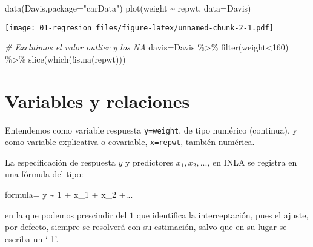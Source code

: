 \documentclass[
]{book}
\newenvironment{Shaded}{\begin{snugshade}}{\end{snugshade}}
\newcommand{\AttributeTok}[1]{\textcolor[rgb]{0.77,0.63,0.00}{#1}}
\newcommand{\CommentTok}[1]{\textcolor[rgb]{0.56,0.35,0.01}{\textit{#1}}}
\newcommand{\DecValTok}[1]{\textcolor[rgb]{0.00,0.00,0.81}{#1}}
\newcommand{\FunctionTok}[1]{\textcolor[rgb]{0.00,0.00,0.00}{#1}}
\newcommand{\NormalTok}[1]{#1}
\newcommand{\OtherTok}[1]{\textcolor[rgb]{0.56,0.35,0.01}{#1}}
\newcommand{\SpecialCharTok}[1]{\textcolor[rgb]{0.00,0.00,0.00}{#1}}
\newcommand{\StringTok}[1]{\textcolor[rgb]{0.31,0.60,0.02}{#1}}
\begin{document}
\begin{Shaded}
\begin{Highlighting}[]
\FunctionTok{data}\NormalTok{(Davis,}\AttributeTok{package=}\StringTok{"carData"}\NormalTok{)}
\FunctionTok{plot}\NormalTok{(weight }\SpecialCharTok{\textasciitilde{}}\NormalTok{ repwt, }\AttributeTok{data=}\NormalTok{Davis)}
\end{Highlighting}
\end{Shaded}

\texttt{[image: 01-regresion\_files/figure-latex/unnamed-chunk-2-1.pdf]}

\begin{Shaded}
\begin{Highlighting}[]
\CommentTok{\# Excluimos el valor outlier y los NA}
\NormalTok{davis}\OtherTok{=}\NormalTok{Davis }\SpecialCharTok{\%\textgreater{}\%}
  \FunctionTok{filter}\NormalTok{(weight}\SpecialCharTok{\textless{}}\DecValTok{160}\NormalTok{) }\SpecialCharTok{\%\textgreater{}\%}
  \FunctionTok{slice}\NormalTok{(}\FunctionTok{which}\NormalTok{(}\SpecialCharTok{!}\FunctionTok{is.na}\NormalTok{(repwt)))}
\end{Highlighting}
\end{Shaded}

\hypertarget{variables-y-relaciones}{%
\section{Variables y relaciones}\label{variables-y-relaciones}}

Entendemos como variable respuesta \texttt{y=weight}, de tipo numérico (continua), y como variable explicativa o covariable, \texttt{x=repwt}, también numérica.

La especificación de respuesta \(y\) y predictores \(x_1,x_2,...\), en INLA se registra en una fórmula del tipo:

\begin{Shaded}
\begin{Highlighting}[]
\NormalTok{formula}\OtherTok{=}\NormalTok{ y }\SpecialCharTok{\textasciitilde{}} \DecValTok{1} \SpecialCharTok{+}\NormalTok{ x\_1 }\SpecialCharTok{+}\NormalTok{ x\_2 }\SpecialCharTok{+}\NormalTok{...}
\end{Highlighting}
\end{Shaded}

en la que podemos prescindir del \(1\) que identifica la interceptación, pues el ajuste, por defecto, siempre se resolverá con su estimación, salvo que en su lugar se escriba un `-1'.
\end{document}
